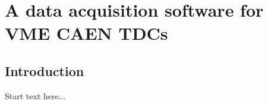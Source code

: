 \graphicspath{{chapt_dutch/}{intro/}{chapt2/}{chapt3/}{chapt4/}{chapt5/}{chapt6/}{chapt7/}}

\renewcommand\evenpagerightmark{{\scshape\small Appendix A}}
\renewcommand\oddpageleftmark{{\scshape\small A data acquisition software for VME CAEN TDCs}}

\renewcommand{\bibname}{References}

\hyphenation{}

\chapter[A data acquisition software for VME CAEN TDCs]%
{A data acquisition software for VME CAEN TDCs}
\label{app1}

\section{Introduction}
Start text here...

\clearpage{\pagestyle{empty}\cleardoublepage}
